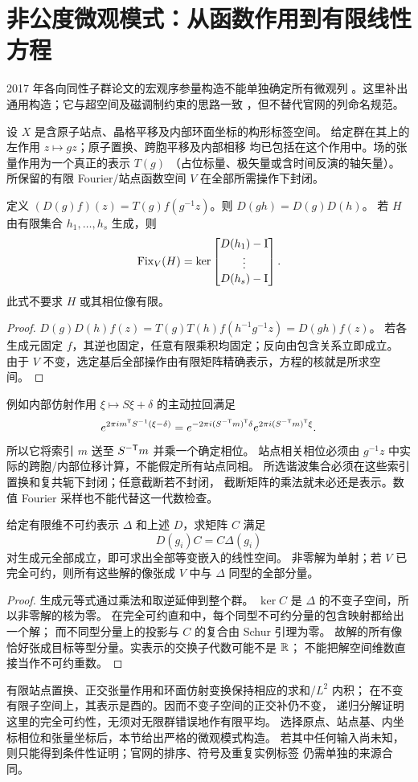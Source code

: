 \section{非公度微观模式：从函数作用到有限线性方程}\label{sec:micro}
2017 年各向同性子群论文的宏观序参量构造不能单独确定所有微观列
\citep{Stokes2017}。这里补出通用构造；它与超空间及磁调制约束的思路一致
\citep{Stokes2013,Magnetic2012}，但不替代官网的列命名规范。

\begin{assumption}[明确可检查的输入]
设 $X$ 是含原子站点、晶格平移及内部环面坐标的构形标签空间。
给定群在其上的左作用 $z\mapsto gz$；原子置换、跨胞平移及内部相移
均已包括在这个作用中。场的张量作用为一个真正的表示 $T(g)$
（占位标量、极矢量或含时间反演的轴矢量）。
所保留的有限 Fourier/站点函数空间 $V$ 在全部所需操作下封闭。
\end{assumption}
\begin{theorem}[微观表示及其固定模式]
定义 $(D(g)f)(z)=T(g)f(g^{-1}z)$。则 $D(gh)=D(g)D(h)$。
若 $H$ 由有限集合 $h_1,\ldots,h_s$ 生成，则
\[
 \operatorname{Fix}_V(H)=\ker\begin{bmatrix}D(h_1)-\mathrm I\\ \vdots\\D(h_s)-\mathrm I\end{bmatrix}.
\]
此式不要求 $H$ 或其相位像有限。
\end{theorem}
\begin{proof}
$D(g)D(h)f(z)=T(g)T(h)f(h^{-1}g^{-1}z)=D(gh)f(z)$。
若各生成元固定 $f$，其逆也固定，任意有限乘积均固定；反向由包含关系立即成立。
由于 $V$ 不变，选定基后全部操作由有限矩阵精确表示，方程的核就是所求空间。
\end{proof}
例如内部仿射作用 $\xi\mapsto S\xi+\delta$ 的主动拉回满足
\[
 e^{2\pi i m^\mathsf T S^{-1}(\xi-\delta)}
 =e^{-2\pi i(S^{-\mathsf T}m)^\mathsf T\delta}
  e^{2\pi i(S^{-\mathsf T}m)^\mathsf T\xi}.
\]
所以它将索引 $m$ 送至 $S^{-\mathsf T}m$ 并乘一个确定相位。
站点相关相位必须由 $g^{-1}z$ 中实际的跨胞/内部位移计算，不能假定所有站点同相。
所选谐波集合必须在这些索引置换和复共轭下封闭；任意截断若不封闭，
截断矩阵的乘法就未必还是表示。数值 Fourier 采样也不能代替这一代数检查。

\begin{proposition}
给定有限维不可约表示 $\Delta$ 和上述 $D$，求矩阵 $C$ 满足
\[
 D(g_i)C=C\Delta(g_i)
\]
对生成元全部成立，即可求出全部等变嵌入的线性空间。
非零解为单射；若 $V$ 已完全可约，则所有这些解的像张成
$V$ 中与 $\Delta$ 同型的全部分量。
\end{proposition}
\begin{proof}
生成元等式通过乘法和取逆延伸到整个群。
$\ker C$ 是 $\Delta$ 的不变子空间，所以非零解的核为零。
在完全可约直和中，每个同型不可约分量的包含映射都给出一个解；
而不同型分量上的投影与 $C$ 的复合由 Schur 引理为零。
故解的所有像恰好张成目标等型分量。实表示的交换子代数可能不是 $\mathbb R$；
不能把解空间维数直接当作不可约重数。
\end{proof}
有限站点置换、正交张量作用和环面仿射变换保持相应的求和/$L^2$ 内积；
在不变有限子空间上，其表示是酉的。因而不变子空间的正交补仍不变，
递归分解证明这里的完全可约性，无须对无限群错误地作有限平均。
选择原点、站点基、内坐标相位和张量坐标后，本节给出严格的微观模式构造。
若其中任何输入尚未知，则只能得到条件性证明；官网的排序、符号及重复实例标签
仍需单独的来源合同。

